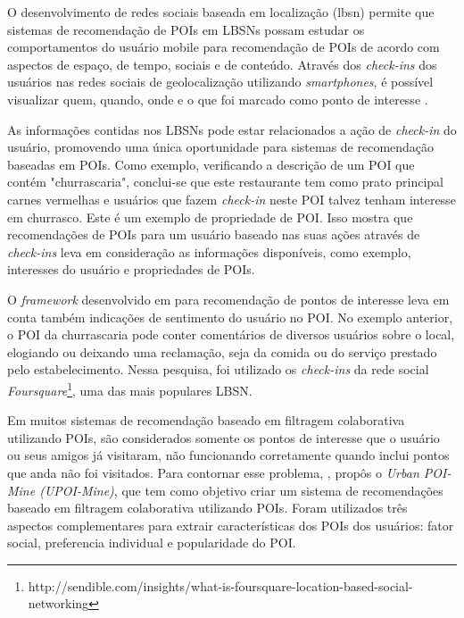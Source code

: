 O desenvolvimento de redes sociais baseada em localização (\ac{lbsn}) permite que sistemas de recomendação de POIs em LBSNs possam estudar os comportamentos do usuário mobile para recomendação de POIs de acordo com aspectos de espaço, de tempo, sociais e de conteúdo. Através dos \textit{check-ins} dos usuários nas redes sociais de geolocalização utilizando \textit{smartphones}, é possível visualizar quem, quando, onde e o que foi marcado como ponto de interesse \citep{AAAI159560}.

As informações contidas nos LBSNs pode estar relacionados a ação de \textit{check-in} do usuário, promovendo uma única oportunidade para sistemas de recomendação baseadas em POIs. Como exemplo, verificando a descrição de um POI que contém "churrascaria", conclui-se que este restaurante tem como prato principal carnes vermelhas e usuários que fazem \textit{check-in} neste POI talvez tenham interesse em churrasco. Este é um exemplo de propriedade de POI. Isso mostra que recomendações de POIs para um usuário baseado nas suas ações através de \textit{check-ins} leva em consideração as informações disponíveis, como exemplo, interesses do usuário e propriedades de POIs.

O \textit{framework} desenvolvido em \cite{AAAI159560} para recomendação de pontos de interesse leva em conta também indicações de sentimento do usuário no POI. No exemplo anterior, o POI da churrascaria pode conter comentários de diversos usuários sobre o local, elogiando ou deixando uma reclamação, seja da comida ou do serviço prestado pelo estabelecimento. Nessa pesquisa, foi utilizado os \textit{check-ins} da rede social \textit{Foursquare}\footnote{http://sendible.com/insights/what-is-foursquare-location-based-social-networking}, uma das mais populares LBSN.

Em muitos sistemas de recomendação baseado em filtragem colaborativa utilizando POIs, são considerados somente os pontos de interesse que o usuário ou seus amigos já visitaram, não funcionando corretamente quando inclui pontos que anda não foi visitados. Para contornar esse problema, \cite{Ying:2012:UPR:2346496.2346507}, propôs o \textit{Urban POI-Mine (UPOI-Mine)}, que tem como objetivo criar um sistema de recomendações baseado em filtragem colaborativa utilizando POIs. Foram utilizados três aspectos complementares para extrair características dos POIs dos usuários: fator social, preferencia individual e popularidade do POI.

